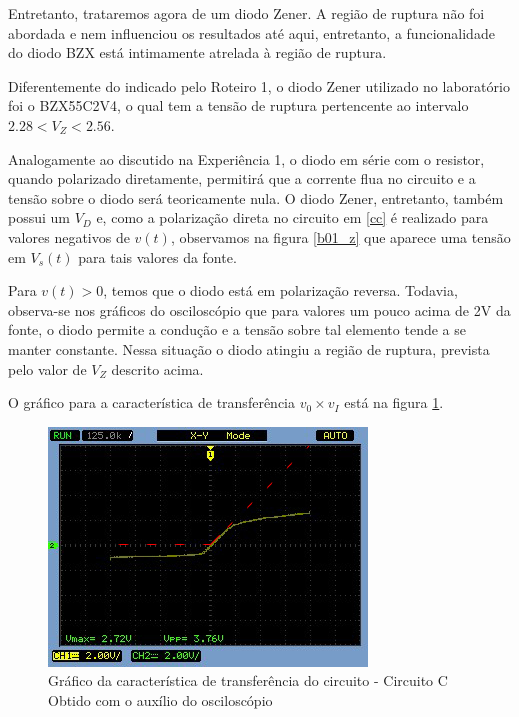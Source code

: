 \documentclass[10pt, final, a4paper]{IEEEtran} %
\begin{document}
Entretanto, trataremos agora de um diodo Zener. A região de ruptura não foi abordada e nem influenciou os resultados até aqui, entretanto, a funcionalidade do diodo BZX está intimamente atrelada à região de ruptura.

Diferentemente do indicado pelo Roteiro 1, o diodo Zener utilizado no laboratório foi o BZX55C2V4, o qual tem a tensão de ruptura pertencente ao intervalo $2.28<V_Z<2.56$.

Analogamente ao discutido na Experiência 1, o diodo em série com o resistor, quando polarizado diretamente, permitirá que a corrente flua no circuito e a tensão sobre o diodo será teoricamente nula. O diodo Zener, entretanto, também possui um $V_D$ e, como a polarização direta no circuito em \ref{cc} é realizado para valores negativos de $v(t)$, observamos na figura \ref{b01_z} que aparece uma tensão em $V_s(t)$ para tais valores da fonte.

Para $v(t) > 0$, temos que o diodo está em polarização reversa. Todavia, observa-se nos gráficos do osciloscópio que para valores um pouco acima de 2V da fonte, o diodo permite a condução e a tensão sobre tal elemento tende a se manter constante. Nessa situação o diodo atingiu a região de ruptura, prevista pelo valor de $V_Z$ descrito acima.

O gráfico para a característica de transferência $v_0 \times v_I$ está na figura \ref{c02}.

\begin{figure}[ht!]
	\captionsetup{justification=centering}
	\centering
	\includegraphics[width=0.8\linewidth]{imagens/circuitos_resp/c02.jpg}
	\caption{Gráfico da característica de transferência do circuito - Circuito C\\ Obtido com o auxílio do osciloscópio}
	\label{c02}
\end{figure}
\FloatBarrier
\end{document}

